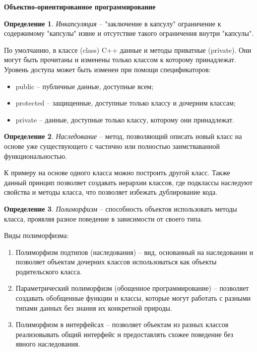 \documentclass[a4paper, 12pt]{article}
\theoremstyle{definition}
\newtheorem*{definition}{Определение}
\begin{document}
    \fontsize{14pt}{20pt}\selectfont
    \begin{center}
        \begin{Large}
            \textbf{Объектно-ориентированное программирование}
        \end{Large}
    \end{center}
    \begin{definition}
        \textit{Инкапсуляция} -- "заключение в капсулу" ограничение к содержимому "капсулы" извне и отсутствие такого ограничения внутри "капсулы".
    \end{definition}
    По умолчанию, в классе (class) C++ данные и методы приватные (private). Они могут быть прочитаны и изменены только классом к которому принадлежат. Уровень доступа может быть изменен при помощи спецификаторов:
    \begin{itemize}
        \item public -- публичные данные, доступные всем;
        \item protected -- защищенные, доступные только классу и дочерним классам;
        \item private -- данные, доступные только классу, которому они принадлежат.
    \end{itemize}
    
    \begin{definition}
        \textit{Наследование} -- метод, позволяющий описать новый класс на основе уже существующего с частично или полностью заимстваванной функциональностью.  
    \end{definition}
    К примеру на основе одного класса можно построить другой класс. Также данный принцип позволяет создавать иерархии классов, где подклассы наследуют свойства и методы класса, что позволяет избежать дублирование кода.

    \begin{definition}
        \textit{Полиморфизм} -- способность объектов использовать методы класса, проявляя разное поведение в зависимости от своего типа. 
    \end{definition}

    Виды полиморфизма:
    \begin{enumerate}
        \item Полиморфизм подтипов (наследования) -- вид, основанный на наследовании и позволяет объектам дочерних классов использоваться как объекты родительского класса.
        \item Параметрический полиморфизм (обощенное программирование) -- позволяет создавать обобщенные функции и классы, которые могут работать с разными типами данных без знания их конкретной природы.
        \item Полиморфизм в интерфейсах -- позволяет объектам из разных классов реализовывать общий интерфейс и предоставлять схожее поведение без явного наследования.
    \end{enumerate}

    
    
        
\end{document}
